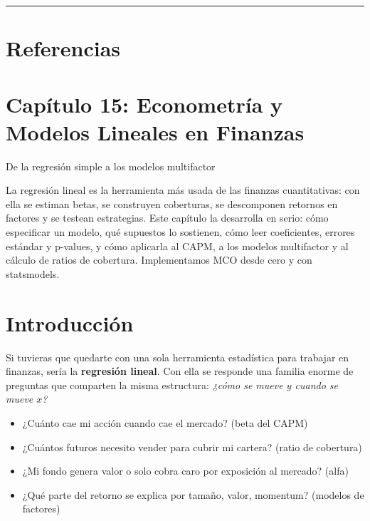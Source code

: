 \documentclass[
  spanish,
  letterpaper,
  DIV=11,
  numbers=noendperiod]{scrreprt}
\providecommand{\tightlist}{%
  \setlength{\itemsep}{0pt}\setlength{\parskip}{0pt}}
\begin{document}
\begin{center}\rule{0.5\linewidth}{0.5pt}\end{center}

\chapter{Referencias}\label{referencias-13}

\label{refs}

\chapter{Capítulo 15: Econometría y Modelos Lineales en
Finanzas}\label{capuxedtulo-15-econometruxeda-y-modelos-lineales-en-finanzas}

De la regresión simple a los modelos multifactor

La regresión lineal es la herramienta más usada de las finanzas
cuantitativas: con ella se estiman betas, se construyen coberturas, se
descomponen retornos en factores y se testean estrategias. Este capítulo
la desarrolla en serio: cómo especificar un modelo, qué supuestos lo
sostienen, cómo leer coeficientes, errores estándar y p-values, y cómo
aplicarla al CAPM, a los modelos multifactor y al cálculo de ratios de
cobertura. Implementamos MCO desde cero y con statsmodels.

\hfill\break

\chapter{Introducción}\label{introducciuxf3n-12}

Si tuvieras que quedarte con una sola herramienta estadística para
trabajar en finanzas, sería la \textbf{regresión lineal}. Con ella se
responde una familia enorme de preguntas que comparten la misma
estructura: \emph{¿cómo se mueve \(y\) cuando se mueve \(x\)?}

\begin{itemize}
\tightlist
\item
  ¿Cuánto cae mi acción cuando cae el mercado? (beta del CAPM)
\item
  ¿Cuántos futuros necesito vender para cubrir mi cartera? (ratio de
  cobertura)
\item
  ¿Mi fondo genera valor o solo cobra caro por exposición al mercado?
  (alfa)
\item
  ¿Qué parte del retorno se explica por tamaño, valor, momentum?
  (modelos de factores)
\end{itemize}
\end{document}
